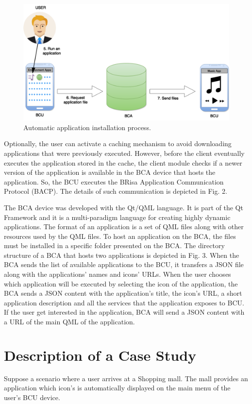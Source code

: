\documentclass[journal]{IEEEtran}
\begin{document}
\begin{figure}[tb]
    \includegraphics[scale = 0.26]{FIG2}
    \caption{Automatic application installation process.}
\end{figure}

Optionally, the user can activate a caching mechanism to avoid downloading applications that were previously executed. However, before the client eventually executes the application stored in the cache, the client module checks if a newer version of the application is available in the BCA device that hosts the application. So, the BCU executes the BRisa Application Communication Protocol (BACP). The details of such communication  is depicted in Fig. 2.

The BCA device was developed with the Qt/QML language. It is part of the Qt Framework and it is a multi-paradigm language for creating highly dynamic applications. The format of an application is a set of QML files along with other resources used by the QML files. To host an application on the BCA, the files must be installed in a specific folder presented on the BCA. The directory structure of a BCA that hosts two applications is depicted in Fig. 3. When the BCA sends the list of available applications to the BCU, it transfers a JSON file along with the applications' names and icons' URLs. When the user chooses which application will be executed by selecting the icon of the application, the BCA sends a JSON content with the application's title, the icon's URL, a short application description and all the services that the application exposes to BCU. If the user get interested in the application, BCA will send a JSON content with a URL of the main QML of the application. 

\section{Description of a Case Study}
Suppose a scenario where a user arrives at a Shopping mall. The mall provides an application which icon's is automatically displayed on the main menu of the user's BCU device.
\end{document}

